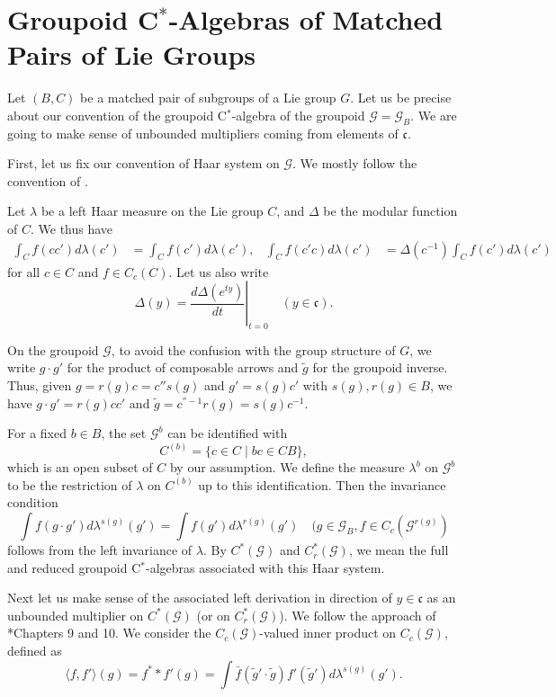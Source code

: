 \documentclass[a4paper,11pt]{amsart}
\newcommand{\s}[1]{\mathcal{#1}}
\newcommand{\fr}[1]{\mathfrak{#1}}
\theoremstyle{definition}
\theoremstyle{remark}
\begin{document}
\appendix
\section{Groupoid \texorpdfstring{C$^*$}{C*}-Algebras of Matched Pairs of Lie Groups}
\label{appdix:grpd-C-star-alg}

Let $(B, C)$ be a matched pair of subgroups of a Lie group $G$.
Let us be precise about our convention of the groupoid C$^*$-algebra of the groupoid $\s G = \s G_B$.
We are going to make sense of unbounded multipliers coming from elements of $\fr c$.

First, let us fix our convention of Haar system on $\s G$.
We mostly follow the convention of \cite{MR584266}.

Let $\lambda$ be a left Haar measure on the Lie group $C$, and $\Delta$ be the modular function of $C$.
We thus have
\begin{align*}
\int_C f(c c') d \lambda(c') &= \int_C f(c') d \lambda(c'),&
\int_C f(c' c) d \lambda(c') &= \Delta(c^{-1}) \int_C f(c') d \lambda(c')
\end{align*}
for all $c \in C$ and $f \in C_c(C)$.
Let us also write
\[
\Delta(y) = \left.\frac{d \Delta(e^{t y})}{d t} \right|_{t=0} \quad (y \in \fr c).
\]

On the groupoid $\s G$, to avoid the confusion with the group structure of $G$, we write $g \cdot g'$ for the product of composable arrows and $\tilde g$ for the groupoid inverse.
Thus, given $g = r(g) c = c'' s(g)$ and $g' = s(g) c'$ with $s(g), r(g) \in B$, we have $g \cdot g' = r(g) c c'$ and $\tilde g = c^{''-1} r(g) = s(g) c^{-1}$.

For a fixed $b \in B$, the set $\s G^b$ can be identified with
\[
C^{(b)} = \{ c \in C \mid b c \in C B \},
\]
which is an open subset of $C$ by our assumption.
We define the measure $\lambda^b$ on $\s G^b$ to be the restriction of $\lambda$ on $C^{(b)}$ up to this identification.
Then the invariance condition
\[
\int f(g \cdot g') d \lambda^{s(g)}(g') = \int f(g') d \lambda^{r(g)}(g') \quad (g \in \s G_B, f \in C_c(\s G^{r(g)})
\]
follows from the left invariance of $\lambda$.
By $C^*(\s G)$ and $C^*_r(\s G)$, we mean the full and reduced groupoid C$^*$-algebras associated with this Haar system.

Next let us make sense of the associated left derivation in direction of $y \in \fr c$ as an unbounded multiplier on $C^*(\s G)$ (or on $C^*_r(\s G)$).
We follow the approach of \cite{MR1325694}*{Chapters 9 and 10}.
We consider the $C_c(\s G)$-valued inner product on $C_c(\s G)$, defined as
\[
\langle f, f' \rangle (g) = f^* * f'(g) = \int \bar f(\tilde g' \cdot \tilde g) f'(\tilde g') d \lambda^{s(g)}(g').
\]
\end{document}
